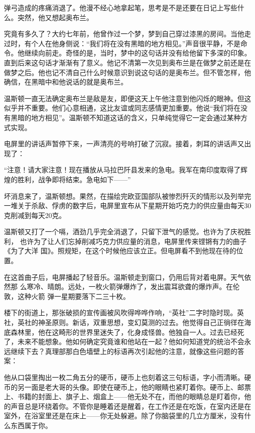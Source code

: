弹弓造成的疼痛消退了。他漫不经心地拿起笔，思考是不是还要在日记上写些什么。突然，他又想起奥布兰。

究竟有多久了？大约七年前，他曾作过一个梦，梦到自己穿过漆黑的房间。当他走过时，有个人在他身侧说：``我们将在没有黑暗的地方相见。''声音很平静，不是命令。他继续向前走。奇怪的是，当时，梦中的这句话并没有给他留下多深的印象。直到后来这句话才渐渐有了意义。他记不清第一次见到奥布兰是在做梦之前还是在做梦之后。他也记不清自己什么时候意识到说这句话的是奥布兰。但不管怎样，他确信，在黑暗中和他说话的就是奥布兰。

温斯顿一直无法确定奥布兰是敌是友，即便这天上午他注意到他闪烁的眼神。但这似乎并不重要。他们心意相通，这比友谊或同志感情更加重要。他说``我们将在没有黑暗的地方相见''。温斯顿不知道这话的含义，只单纯觉得它一定会通过某种方式实现。

电屏里的讲话声暂停下来，一声清亮的号响打破了沉寂。接着，刺耳的讲话声又出现了：

``注意！请大家注意！现在播放从马拉巴阡县发来的急电。我军在南印度取得了辉煌的胜利，战争即将结束。急电如下——''

坏消息来了，温斯顿想。果然，在描绘完欧亚国部队被惨烈歼灭的情形以及列举完一堆关于杀敌、俘虏的数字后，电屏里宣布从下星期开始巧克力的供应量由每天30克削减到每天20克。

温斯顿又打了一个嗝，酒劲几乎完全消退了，只留下泄气的感觉。也许为了庆祝胜利，
也许为了让人们忘掉削减巧克力供应量的消息，电屏里传来铿锵有力的曲子《为了大洋
国》。照规矩，在这个时候他应该立正。但电屏看不到他现在待的位置。

在这首曲子后，电屏播起了轻音乐。温斯顿走到窗口，仍用后背对着电屏。天气依然那
么寒冷、晴朗。远处，一枚火箭弹爆炸了，发出震耳欲聋的爆炸声。在伦敦，这种火箭
弹一星期要落下二三十枚。

楼下的街道上，那张破损的宣传画被风吹得哗哗作响，``英社''二字时隐时现。英社，英社的神圣原则。新话，双重思想，变幻莫测的过去。他觉得自己正徜徉在海底森林里，他在这畸形的世界里迷失了，化身成怪兽。他独自一人。过去已经死了，未来不能想象。他如何确定究竟谁和他站在一起？他如何知道党的统治不会永远继续下去？真理部那白色墙壁上的标语再次引起他的注意，就像这些问题的答案：


他从口袋里掏出一枚二角五分的硬币，硬币上也刻着这三句标语，字小而清晰。硬币的另一面是老大哥的头像。即使在硬币上，他的眼睛也紧盯着你。硬币上、邮票上、书籍的封面上、旗子上、烟盒上——他无处不在，而他的眼睛总是盯着你，他的声音总是环绕着你。不管你是睡着还是醒着，在工作还是在吃饭，在室内还是在室外，在浴室里还是在床上——你无处躲避。除了你脑袋里的几立方厘米，没有什么东西属于你。

